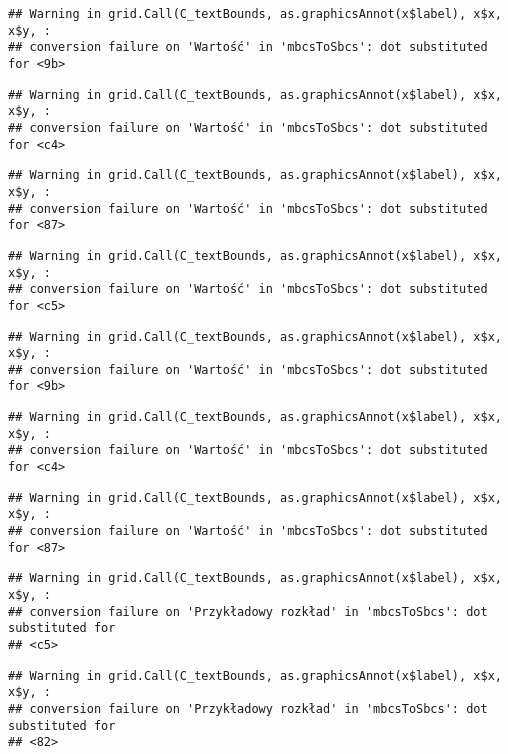\documentclass[
]{book}
\begin{document}
\begin{verbatim}
## Warning in grid.Call(C_textBounds, as.graphicsAnnot(x$label), x$x, x$y, :
## conversion failure on 'Wartość' in 'mbcsToSbcs': dot substituted for <9b>
\end{verbatim}

\begin{verbatim}
## Warning in grid.Call(C_textBounds, as.graphicsAnnot(x$label), x$x, x$y, :
## conversion failure on 'Wartość' in 'mbcsToSbcs': dot substituted for <c4>
\end{verbatim}

\begin{verbatim}
## Warning in grid.Call(C_textBounds, as.graphicsAnnot(x$label), x$x, x$y, :
## conversion failure on 'Wartość' in 'mbcsToSbcs': dot substituted for <87>
\end{verbatim}

\begin{verbatim}
## Warning in grid.Call(C_textBounds, as.graphicsAnnot(x$label), x$x, x$y, :
## conversion failure on 'Wartość' in 'mbcsToSbcs': dot substituted for <c5>
\end{verbatim}

\begin{verbatim}
## Warning in grid.Call(C_textBounds, as.graphicsAnnot(x$label), x$x, x$y, :
## conversion failure on 'Wartość' in 'mbcsToSbcs': dot substituted for <9b>
\end{verbatim}

\begin{verbatim}
## Warning in grid.Call(C_textBounds, as.graphicsAnnot(x$label), x$x, x$y, :
## conversion failure on 'Wartość' in 'mbcsToSbcs': dot substituted for <c4>
\end{verbatim}

\begin{verbatim}
## Warning in grid.Call(C_textBounds, as.graphicsAnnot(x$label), x$x, x$y, :
## conversion failure on 'Wartość' in 'mbcsToSbcs': dot substituted for <87>
\end{verbatim}

\begin{verbatim}
## Warning in grid.Call(C_textBounds, as.graphicsAnnot(x$label), x$x, x$y, :
## conversion failure on 'Przykładowy rozkład' in 'mbcsToSbcs': dot substituted for
## <c5>
\end{verbatim}

\begin{verbatim}
## Warning in grid.Call(C_textBounds, as.graphicsAnnot(x$label), x$x, x$y, :
## conversion failure on 'Przykładowy rozkład' in 'mbcsToSbcs': dot substituted for
## <82>
\end{verbatim}
\end{document}
